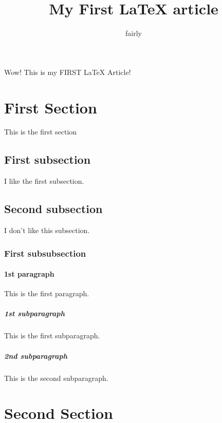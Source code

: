 \documentclass{article}
\author{fairly}
\title{My First \LaTeX{} article}
\begin{document}
    \maketitle
    
    Wow! This is my FIRST \LaTeX{} Article!
    
    \section{First Section}
    This is the first section
    \subsection{First subsection}
    I like the first subsection.
    \subsection{Second subsection}
    I don't like this subsection.
    \subsubsection{First subsubsection}
    \paragraph{1st paragraph}
    This is the first paragraph.
    \subparagraph{1st subparagraph}
    This is the first subparagraph.
    \subparagraph{2nd subparagraph}
    This is the second subparagraph.
    \section{Second Section}
\end{document}
